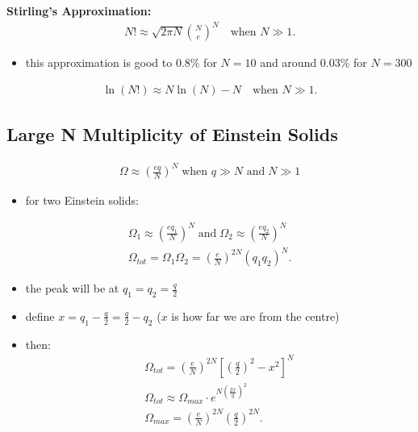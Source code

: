 \documentclass[10pt]{article}
\begin{document}
\begin{theorem}
    \textbf{Stirling's Approximation:} 
    \begin{align*}
        N! \approx \sqrt{2\pi N} {N \choose e}^N \quad \text{when $N \gg 1$}
    .\end{align*}
    \begin{itemize}
        \item this approximation is good to 0.8\% for $N = 10$ and around 0.03\% for $N = 300$
    \end{itemize}
    \begin{align*}
        \ln(N!) \approx N \ln(N) - N \quad \text{when $N\gg 1$}
    .\end{align*}
\end{theorem}

\subsection{Large N Multiplicity of Einstein Solids}
\begin{align}
    \Omega \approx \left( \frac{eq}{N} \right) ^N \; \text{when $q \gg N$ and} \; N \gg 1
\end{align}
\begin{itemize}
    \item for two Einstein solids:
\end{itemize}
\begin{align*}
    \Omega_1 \approx \left( \frac{eq_1}{N} \right) ^N \; \text{and} \; \Omega_2 \approx \left( \frac{eq_2}{N} \right) ^N \\ 
    \Omega_{tot} = \Omega_1 \Omega_2 = \left( \frac{e}{N} \right) ^{2N} (q_1 q_2)^N
.\end{align*}
\begin{itemize}
    \item the peak will be at $q_1 = q_2 = \frac{q}{2}$
    \item define $x = q_1 - \frac{q}{2} = \frac{q}{2} - q_2$ ($x$ is how far we are from the centre)
    \item then:
        \begin{align*}
            \Omega_{tot} = \left( \frac{e}{N} \right) ^{2N} \left[ \left( \frac{q}{2} \right) ^2 - x^2 \right] ^N \\ 
            \Omega_{tot} \approx \Omega_{max} \cdot e^{N(\frac{2x}{q})^2} \\ 
            \Omega_{max} = \left( \frac{e}{N} \right)^{2N} \left( \frac{q}{2}\right)^{2N}  
        .\end{align*}
\end{itemize}
\end{document}
